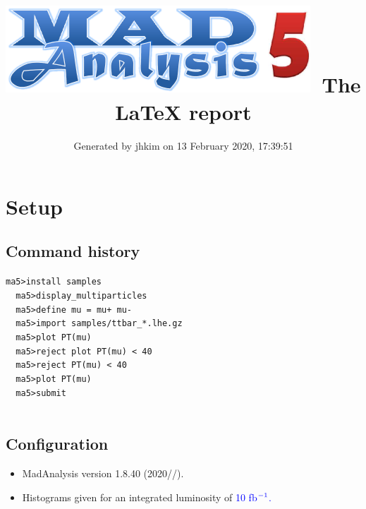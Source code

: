\documentclass[a4paper, 10pt]{article}
\title{{\includegraphics[scale=.4]{logo.png}}\ The LaTeX report}
\author{Generated by jhkim on 13 February 2020, 17:39:51}
\begin{document}
\maketitle
\flushbottom

\newpage
\section{ Setup}

\subsection{ Command history}

\texttt{ma5>install samples\\
}
\texttt{ }\texttt{ }\texttt{ma5>display\_multiparticles\\
}
\texttt{ }\texttt{ }\texttt{ma5>define mu = mu+ mu-\\
}
\texttt{ }\texttt{ }\texttt{ma5>import samples/\-ttbar\_*.lhe.gz\\
}
\texttt{ }\texttt{ }\texttt{ma5>plot PT(mu)\\
}
\texttt{ }\texttt{ }\texttt{ma5>reject plot PT(mu) < 40\\
}
\texttt{ }\texttt{ }\texttt{ma5>reject PT(mu) < 40\\
}
\texttt{ }\texttt{ }\texttt{ma5>plot PT(mu)\\
}
\texttt{ }\texttt{ }\texttt{ma5>submit\\
}
\texttt{ }\texttt{ }\subsection{ Configuration}

\begin{itemize}
  \item MadAnalysis version 1.8.40 (2020//).
   \item Histograms given for an integrated luminosity of \textcolor{blue}{10}\textcolor{blue}{ fb}$^{\textcolor{blue}{-1}}$\textcolor{blue}{.}
\textcolor{blue}{}
\end{itemize}
\newpage
\end{document}

